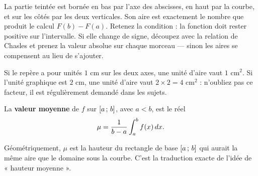 \begin{visualisation}
\begin{center}
\end{center}

La partie teintée est bornée en bas par l'axe des abscisses, en haut par la
courbe, et sur les côtés par les deux verticales. Son aire est exactement le
nombre que produit le calcul $F(b)-F(a)$. Retenez la condition : la fonction
doit rester positive sur l'intervalle. Si elle change de signe, découpez avec
la relation de Chasles et prenez la valeur absolue sur chaque morceau — sinon
les aires se compensent au lieu de s'ajouter.
\end{visualisation}

\begin{remarque}
Si le repère a pour unités $1$ cm sur les deux axes, une unité d'aire vaut
$1$ cm$^{2}$. Si l'unité graphique est $2$ cm, une unité d'aire vaut
$2 \times 2 = 4$ cm$^{2}$ : n'oubliez pas ce facteur, il est régulièrement
demandé dans les sujets.
\end{remarque}

\begin{definition}
La \textbf{valeur moyenne} de $f$ sur $\left[a\,;\,b\right]$, avec $a<b$, est le
réel
\[
  \mu = \frac{1}{b-a}\int_{a}^{b} f(x)\,dx .
\]
\end{definition}

\begin{remarque}
Géométriquement, $\mu$ est la hauteur du rectangle de base $\left[a\,;\,b\right]$
qui aurait la même aire que le domaine sous la courbe. C'est la traduction
exacte de l'idée de « hauteur moyenne ».
\end{remarque}

